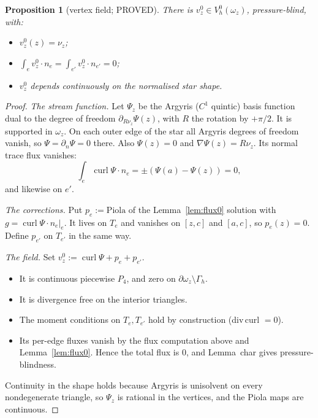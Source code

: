 \documentclass[11pt]{article}
\newtheorem{proposition}[theorem]{Proposition}
\theoremstyle{remark}
\newcommand{\Gh}{\Gamma_h}
\begin{document}
\begin{proposition}[vertex field; PROVED]\label{prop:vz}
There is $v_z^0\in V_h^0(\omega_z)$, pressure-blind, with:
\begin{itemize}
\item $v_z^0(z)=\nu_z$;
\item $\int_ev_z^0\cdot n_e=\int_{e'}v_z^0\cdot n_{e'}=0$;
\item $v_z^0$ depends continuously on the normalised star shape.
\end{itemize}
\end{proposition}
\begin{proof}
\emph{The stream function.} Let $\Psi_z$ be the Argyris ($C^1$ quintic) basis function dual to the degree of freedom
$\partial_{R\nu_z}\Psi(z)$, with $R$ the rotation by $+\pi/2$. It is supported in $\omega_z$. On each outer edge of the star all Argyris degrees of freedom vanish, so $\Psi=\partial_n\Psi=0$ there.
Also $\Psi(z)=0$ and $\nabla\Psi(z)=R\nu_z$. Its normal trace flux vanishes:
\[
\int_e\operatorname{curl}\Psi\cdot n_e=\pm(\Psi(a)-\Psi(z))=0,
\]
and likewise on $e'$.

\emph{The corrections.} Put $p_e:=\mathrm{Piola}$ of the Lemma~\ref{lem:flux0} solution with $g=\operatorname{curl}\Psi\cdot n_e|_e$. It lives on $T_e$ and vanishes on
$[z,c]$ and $[a,c]$, so $p_e(z)=0$. Define $p_{e'}$ on $T_{e'}$ in the same way.

\emph{The field.} Set $v_z^0:=\operatorname{curl}\Psi+p_e+p_{e'}$.
\begin{itemize}
\item It is continuous piecewise $P_4$, and zero on $\partial\omega_z\setminus\Gh$.
\item It is divergence free on the interior triangles.
\item The moment conditions on $T_e,T_{e'}$ hold by construction (div\,curl $=0$).
\item Its per-edge fluxes vanish by the flux computation above and Lemma~\ref{lem:flux0}. Hence the total flux is $0$, and Lemma~char gives pressure-blindness.
\end{itemize}
Continuity in the shape holds because Argyris is unisolvent on every nondegenerate triangle, so $\Psi_z$ is rational in the vertices, and the Piola maps are continuous.
\end{proof}
\end{document}
